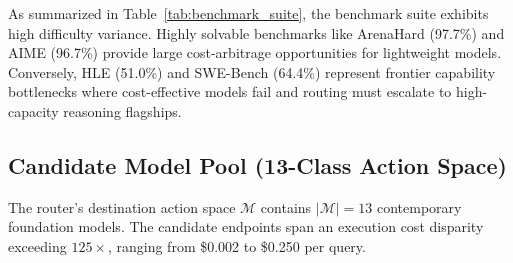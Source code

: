 \documentclass[11pt,a4paper]{article}
\begin{document}
As summarized in Table~\ref{tab:benchmark_suite}, the benchmark suite exhibits high difficulty variance. Highly solvable benchmarks like ArenaHard (97.7\%) and AIME (96.7\%) provide large cost-arbitrage opportunities for lightweight models. Conversely, HLE (51.0\%) and SWE-Bench (64.4\%) represent frontier capability bottlenecks where cost-effective models fail and routing must escalate to high-capacity reasoning flagships.

\subsection{Candidate Model Pool (13-Class Action Space)}
\label{subsec:candidate_models}

The router's destination action space $\mathcal{M}$ contains $|\mathcal{M}| = 13$ contemporary foundation models. The candidate endpoints span an execution cost disparity exceeding $125\times$, ranging from \$0.002 to \$0.250 per query.
\end{document}
